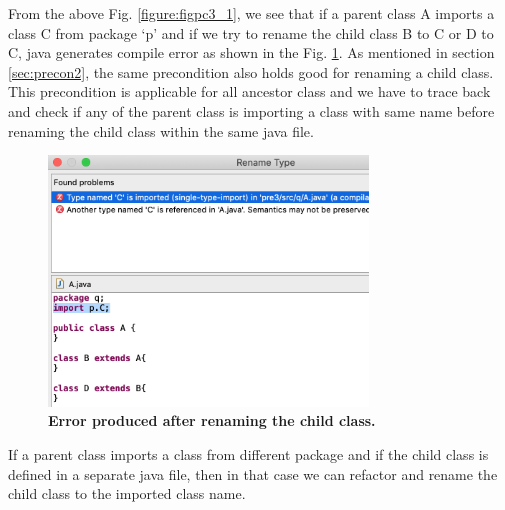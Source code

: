 From the above Fig. \ref{figure:figpc3_1}, we see that if a parent class A imports a class C from package `p' and if we try to rename the child class B to C or D to C, java generates compile error as shown in the Fig. \ref{figure:figpc3_2}. As mentioned in  section \ref{sec:precon2}, the same precondition also holds good for renaming a child class. This precondition is applicable for all ancestor class and we have to trace back and check if any of the parent class is importing a class with same name before renaming the child class within the same java file.
\begin{figure}[htbp]
\centerline{\includegraphics[width=85mm,scale=0.5]{precond3.png}}
\caption{\textbf{Error produced after renaming the child class.}}
\label{figure:figpc3_2}
\end{figure}

If a parent class imports a class from different package and if the child class is defined in a separate java file, then in that case we can refactor and rename the child class to the imported class name.
